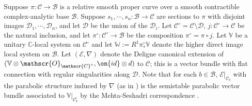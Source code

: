 \begin{notation}
\notready
	\label{notation:period-map}
	Suppose $\pi: \mathscr{C} \to \mathscr{B}$ is a relative smooth proper curve over a smooth
	contractible complex-analytic base $\mathscr{B}$. Suppose $s_1, \cdots,
	s_n: \mathscr{B}\to \mathscr{C}$ are sections to $\pi$ with disjoint
	images $\mathscr{D}_1, \cdots, \mathscr{D}_n$, and let $\mathscr{D}$ be
	the union of the $\mathscr{D}_i$. Let
	$\mathscr{C}^\circ=\mathscr{C}\setminus \mathscr{D}$,
	$j:\mathscr{C}^\circ\to \mathscr{C}$ be the natural inclusion, and let $\pi^\circ: \mathscr{C}^\circ \to \mathscr{B}$ be the composition $\pi^\circ=\pi\circ j$.
Let $\mathbb V$ be a unitary $\mathbb C$-local system on $\mathscr{C}^\circ$ and
let
$\mathbb{W}:=R^1 \pi^\circ_* \mathbb V$ denote the higher direct image local system on $\mathscr{B}$.
Let $(\mathscr E, \nabla)$ denote the Deligne canonical extension
\cite[Remarques 5.5(i)]{deligne:regular-singular}
of $(\mathbb{V}\otimes \mathscr{O}_{\mathscr{C}^\circ}, \on{id}\otimes d)$ to $\mathscr{C}$; this is a vector bundle with flat connection with regular singularities along $\mathscr{D}$. Note that for each $b\in \mathscr{B}$, $\mathscr{E}|_{\mathscr{C}_b}$ with the parabolic structure induced by $\nabla$ (as in \cite[Definition 3.3.1]{LL:geometric-local-systems}) is the semistable parabolic vector bundle associated to $\mathbb{V}|_{\mathscr{C}_b^\circ}$ by the Mehta-Seshadri correspondence \cite{mehta1980moduli,simpson1990harmonic}.

\end{notation}

